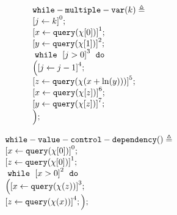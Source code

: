         \begin{example}
            \[
            \begin{array}{l}
            \kw{while-multiple-var}(k) \triangleq \\
            \clabel{\assign{j}{k} }^{0} ; \\
            \clabel{ \assign{x}{\query(\chi[0])}}^{1} ; \\
                \clabel{ \assign{y}{\query(\chi[1])}}^{2} ; \\
                    \ewhile ~ \clabel{j > 0}^{3} ~ \edo ~ \\
                    \Big(
                     \clabel{\assign{j}{j-1}}^{4} ;\\
                     \clabel{\assign{z}{\query(\chi(x + \ln(y)))} }^{5}  ; \\
                     \clabel{ \assign{x}{\query(\chi[z])}}^{6} ; \\
                     \clabel{ \assign{y}{\query(\chi[z])}}^{7} ; \\
                    \Big);
                \end{array}
            \]
            \end{example}
            \begin{example}
                \[
                \begin{array}{l}
                \kw{while-value-control-dependency}() \triangleq \\
                    \clabel{ \assign{x}{\query(\chi[0])} }^{0} ; \\
                    \clabel{ \assign{z}{\query(\chi[0])} }^{1} ; \\
                        \ewhile ~ \clabel{x > 0}^{2} ~ \edo ~ \\
                        \Big(
                        \clabel{\assign{x}{\query(\chi(z))} }^{3}  ; \\
                        \clabel{\assign{z}{\query(\chi(x))}}^{4} ;
                      \Big);
                    \end{array}
                \]
                \end{example}
%
